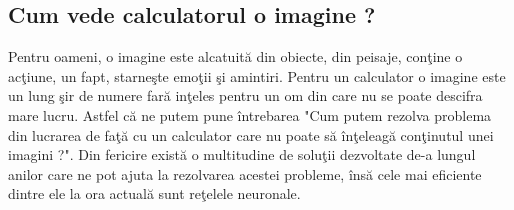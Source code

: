 \subsection{Cum vede calculatorul o imagine ?}

Pentru oameni, o imagine este alcatuit\u{a} din obiecte, din peisaje, con\c{t}ine o ac\c{t}iune, un fapt, starne\c{s}te emo\c{t}ii \c{s}i amintiri. Pentru un calculator o imagine este un lung \c{s}ir de numere far\u{a} in\c{t}eles pentru un om din care nu se poate descifra mare lucru. Astfel c\u{a} ne putem pune \^{i}ntrebarea "Cum putem rezolva problema din lucrarea de fa\c{t}\u{a} cu un calculator care nu poate s\u{a} \^{i}n\c{t}eleag\u{a} con\c{t}inutul unei imagini ?". Din fericire exist\u{a} o multitudine de solu\c{t}ii dezvoltate de-a lungul anilor care ne pot ajuta la rezolvarea acestei probleme, \^{i}ns\u{a} cele mai eficiente dintre ele la ora actual\u{a} sunt re\c{t}elele neuronale.